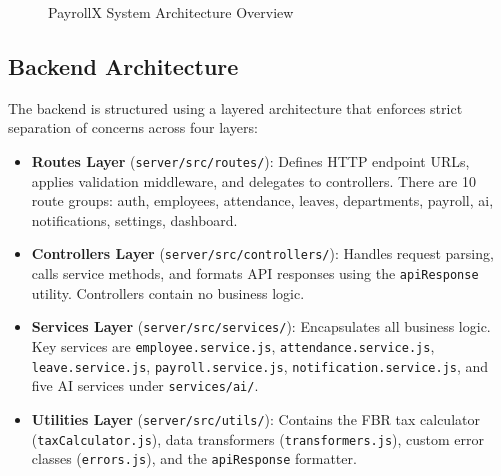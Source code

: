 \documentclass[12pt,a4paper]{report}
\begin{document}
\begin{figure}[H]
\caption{PayrollX System Architecture Overview}
\label{fig:architecture}
\end{figure}

\subsection{Backend Architecture}

The backend is structured using a layered architecture that enforces strict separation of concerns across four layers:

\begin{itemize}
    \item \textbf{Routes Layer} (\texttt{server/src/routes/}): Defines HTTP endpoint URLs, applies validation middleware, and delegates to controllers. There are 10 route groups: auth, employees, attendance, leaves, departments, payroll, ai, notifications, settings, dashboard.
    \item \textbf{Controllers Layer} (\texttt{server/src/controllers/}): Handles request parsing, calls service methods, and formats API responses using the \texttt{apiResponse} utility. Controllers contain no business logic.
    \item \textbf{Services Layer} (\texttt{server/src/services/}): Encapsulates all business logic. Key services are \texttt{employee.service.js}, \texttt{attendance.service.js}, \texttt{leave.service.js}, \texttt{payroll.service.js}, \texttt{notification.service.js}, and five AI services under \texttt{services/ai/}.
    \item \textbf{Utilities Layer} (\texttt{server/src/utils/}): Contains the FBR tax calculator (\texttt{taxCalculator.js}), data transformers (\texttt{transformers.js}), custom error classes (\texttt{errors.js}), and the \texttt{apiResponse} formatter.
\end{itemize}
\end{document}
